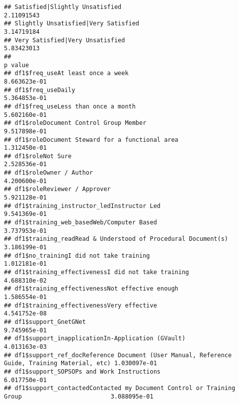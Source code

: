 \documentclass[]{article}
\begin{document}
\begin{verbatim}
## Satisfied|Slightly Unsatisfied                                                                2.11091543
## Slightly Unsatisfied|Very Satisfied                                                           3.14719184
## Very Satisfied|Very Unsatisfied                                                               5.83423013
##                                                                                                   p value
## df1$freq_useAt least once a week                                                             8.663623e-01
## df1$freq_useDaily                                                                            5.364853e-01
## df1$freq_useLess than once a month                                                           5.602160e-01
## df1$roleDocument Control Group Member                                                        9.517898e-01
## df1$roleDocument Steward for a functional area                                               1.312450e-01
## df1$roleNot Sure                                                                             2.528536e-01
## df1$roleOwner / Author                                                                       4.200600e-01
## df1$roleReviewer / Approver                                                                  5.921128e-01
## df1$training_instructor_ledInstructor Led                                                    9.541369e-01
## df1$training_web_basedWeb/Computer Based                                                     3.737953e-01
## df1$training_readRead & Understood of Procedural Document(s)                                 3.186199e-01
## df1$no_trainingI did not take training                                                       1.012181e-01
## df1$training_effectivenessI did not take training                                            4.688310e-02
## df1$training_effectivenessNot effective enough                                               1.586554e-01
## df1$training_effectivenessVery effective                                                     4.541752e-08
## df1$support_GnetGNet                                                                         9.745965e-01
## df1$support_inapplicationIn-Application (GVault)                                             4.013163e-03
## df1$support_ref_docReference Document (User Manual, Reference Guide, Training Material, etc) 1.030097e-01
## df1$support_SOPSOPs and Work Instructions                                                    6.017750e-01
## df1$support_contactedContacted my Document Control or Training Group                         3.088095e-01

\end{verbatim}
\end{document}
